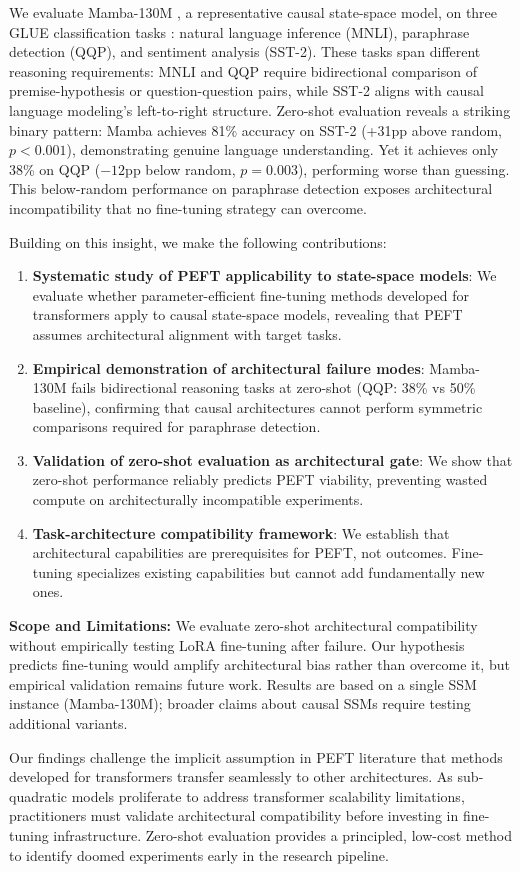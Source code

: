 We evaluate Mamba-130M \cite{gu2023mamba}, a representative causal state-space model, on three GLUE classification tasks \cite{wang2018glue}: natural language inference (MNLI), paraphrase detection (QQP), and sentiment analysis (SST-2). These tasks span different reasoning requirements: MNLI and QQP require bidirectional comparison of premise-hypothesis or question-question pairs, while SST-2 aligns with causal language modeling's left-to-right structure. Zero-shot evaluation reveals a striking binary pattern: Mamba achieves 81\% accuracy on SST-2 (+31pp above random, $p<0.001$), demonstrating genuine language understanding. Yet it achieves only 38\% on QQP ($-12$pp below random, $p=0.003$), performing worse than guessing. This below-random performance on paraphrase detection exposes architectural incompatibility that no fine-tuning strategy can overcome.

Building on this insight, we make the following contributions:

\begin{enumerate}
\item \textbf{Systematic study of PEFT applicability to state-space models}: We evaluate whether parameter-efficient fine-tuning methods developed for transformers apply to causal state-space models, revealing that PEFT assumes architectural alignment with target tasks.

\item \textbf{Empirical demonstration of architectural failure modes}: Mamba-130M fails bidirectional reasoning tasks at zero-shot (QQP: 38\% vs 50\% baseline), confirming that causal architectures cannot perform symmetric comparisons required for paraphrase detection.

\item \textbf{Validation of zero-shot evaluation as architectural gate}: We show that zero-shot performance reliably predicts PEFT viability, preventing wasted compute on architecturally incompatible experiments.

\item \textbf{Task-architecture compatibility framework}: We establish that architectural capabilities are prerequisites for PEFT, not outcomes. Fine-tuning specializes existing capabilities but cannot add fundamentally new ones.
\end{enumerate}

\textbf{Scope and Limitations:} We evaluate zero-shot architectural compatibility without empirically testing LoRA fine-tuning after failure. Our hypothesis predicts fine-tuning would amplify architectural bias rather than overcome it, but empirical validation remains future work. Results are based on a single SSM instance (Mamba-130M); broader claims about causal SSMs require testing additional variants.

Our findings challenge the implicit assumption in PEFT literature that methods developed for transformers transfer seamlessly to other architectures. As sub-quadratic models proliferate to address transformer scalability limitations, practitioners must validate architectural compatibility before investing in fine-tuning infrastructure. Zero-shot evaluation provides a principled, low-cost method to identify doomed experiments early in the research pipeline.
